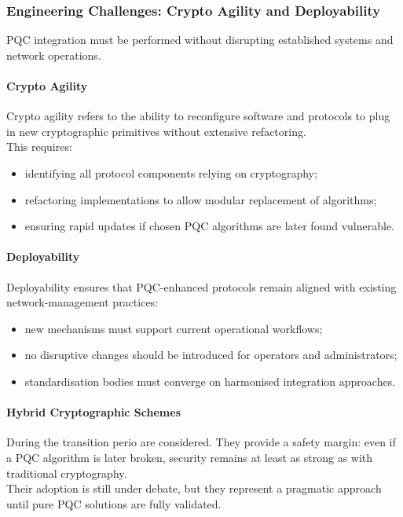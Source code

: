 \subsubsection*{Engineering Challenges: Crypto Agility and Deployability}
PQC integration must be performed without disrupting established systems and network operations.

\paragraph*{Crypto Agility}
Crypto agility refers to the ability to reconfigure software and protocols to plug in new cryptographic primitives without extensive refactoring.\\
This requires:
\begin{itemize}
    \item identifying all protocol components relying on cryptography;
    \item refactoring implementations to allow modular replacement of algorithms;
    \item ensuring rapid updates if chosen PQC algorithms are later found vulnerable.
\end{itemize}

\paragraph*{Deployability}
Deployability ensures that PQC-enhanced protocols remain aligned with existing network-management practices:
\begin{itemize}
    \item new mechanisms must support current operational workflows;
    \item no disruptive changes should be introduced for operators and administrators;
    \item standardisation bodies must converge on harmonised integration approaches.
\end{itemize}

\paragraph*{Hybrid Cryptographic Schemes}
During the transition perio are considered. They provide a safety margin: even if a PQC algorithm is later broken, security remains at least as strong as with traditional cryptography. 
\\
Their adoption is still under debate, but they represent a pragmatic approach until pure PQC solutions are fully validated.

